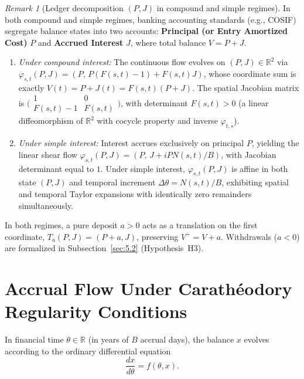 \documentclass[11pt, a4paper]{article}
\theoremstyle{definition}
\theoremstyle{plain}
\theoremstyle{remark}
\newtheorem{observacao}[definicao]{Remark}
\begin{document}
\begin{observacao}[Ledger decomposition $(P, J)$ in compound and simple regimes]\label{obs:2.8}
In both compound and simple regimes, banking accounting standards (e.g., COSIF) segregate balance states into two accounts: \textbf{Principal (or Entry Amortized Cost)} $P$ and \textbf{Accrued Interest} $J$, where total balance $V = P + J$.
\begin{enumerate}[label=(\alph*)]
    \item \emph{Under compound interest:} The continuous flow evolves on $(P, J) \in \mathbb{R}^2$ via $\varphi_{s,t}(P, J) = (P,\, P(F(s,t)-1) + F(s,t)J)$, whose coordinate sum is exactly $V(t) = P + J(t) = F(s,t)(P + J)$. The spatial Jacobian matrix is $\Big(\begin{smallmatrix} 1 & 0 \\ F(s,t)-1 & F(s,t) \end{smallmatrix}\Big)$, with determinant $F(s,t) > 0$ (a linear diffeomorphism of $\mathbb{R}^2$ with cocycle property and inverse $\varphi_{t,s}$).
    \item \emph{Under simple interest:} Interest accrues exclusively on principal $P$, yielding the linear shear flow $\varphi_{s,t}(P, J) = (P,\, J + i P N(s,t)/B)$, with Jacobian determinant equal to $1$. Under simple interest, $\varphi_{s,t}(P, J)$ is affine in both state $(P, J)$ and temporal increment $\Delta\theta = N(s,t)/B$, exhibiting spatial and temporal Taylor expansions with identically zero remainders simultaneously.
\end{enumerate}
In both regimes, a pure deposit $a > 0$ acts as a translation on the first coordinate, $T_a(P, J) = (P + a, J)$, preserving $V^+ = V + a$. Withdrawals ($a < 0$) are formalized in Subsection~\ref{sec:5.2} (Hypothesis~H3).
\end{observacao}

\section{Accrual Flow Under Carathéodory Regularity Conditions}\label{sec:3}

In financial time $\theta \in \mathbb{R}$ (in years of $B$ accrual days), the balance $x$ evolves according to the ordinary differential equation
\begin{equation}\label{eq:edo}
\frac{dx}{d\theta} = f(\theta, x).
\end{equation}
\end{document}

